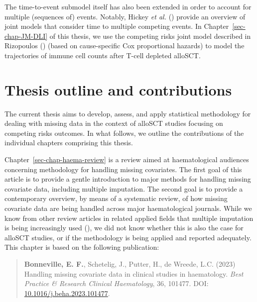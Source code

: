 \documentclass[
  letterpaper,
  paper=240mm:170mm,
  twoside=true,
  open=right,
  fontsize=10pt,
  pagesize=false,
  BCOR=15mm,
  DIV=14,
  headinclude=true,
  footinclude=false,
  headsepline=on]{scrbook}
\begin{document}
The time-to-event submodel itself has also been extended in order to
account for multiple (sequences of) events. Notably, Hickey \emph{et
al.} () provide an
overview of joint models that consider time to multiple competing
events. In Chapter~\ref{sec-chap-JM-DLI} of this thesis, we use the
competing risks joint model described in Rizopoulos
() (based on
cause-specific Cox proportional hazards) to model the trajectories of
immune cell counts after T-cell depleted alloSCT.

\section{Thesis outline and contributions}\label{sec-intro-outline}

The current thesis aims to develop, assess, and apply statistical
methodology for dealing with missing data in the context of alloSCT
studies focusing on competing risks outcomes. In what follows, we
outline the contributions of the individual chapters comprising this
thesis.

Chapter~\ref{sec-chap-haema-review} is a review aimed at haematological
audiences concerning methodology for handling missing covariates. The
first goal of this article is to provide a gentle introduction to major
methods for handling missing covariate data, including multiple
imputation. The second goal is to provide a contemporary overview, by
means of a systematic review, of how missing covariate data are being
handled across major haematological journals. While we know from other
review articles in related applied fields that multiple imputation is
being increasingly used
(), we did not know whether this is also the case for
alloSCT studies, or if the methodology is being applied and reported
adequately. This chapter is based on the following publication:

\begin{quote}
\textbf{Bonneville, E. F.}, Schetelig, J., Putter, H., de Wreede, L.C.
(2023) Handling missing covariate data in clinical studies in
haematology. \emph{Best Practice \& Research Clinical Haematology}, 36,
101477. DOI:
\href{https://doi.org/10.1016/j.beha.2023.101477}{10.1016/j.beha.2023.101477}.
\end{quote}
\end{document}
